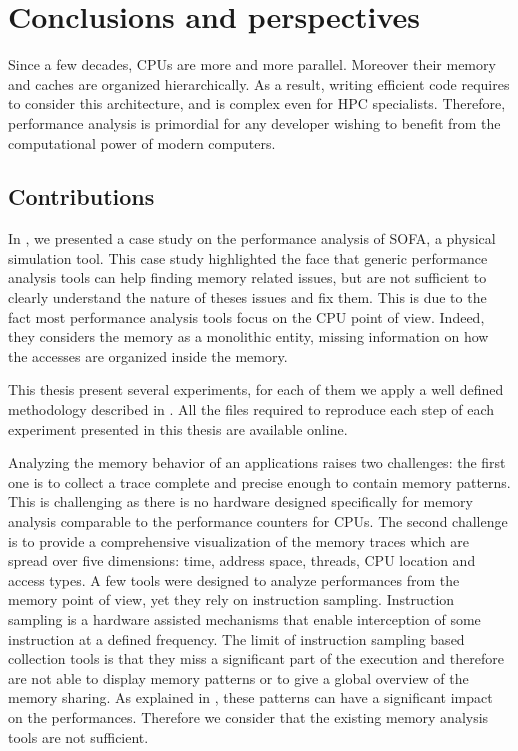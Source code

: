 \chapter{Conclusions and perspectives}
\label{chap:cncl}

Since a few decades, \glspl{CPU} are more and more parallel.
Moreover their memory and caches are organized hierarchically.
As a result, writing efficient code requires to consider this architecture, and is complex even for \gls{HPC} specialists.
Therefore, performance analysis is primordial for any developer wishing to benefit from the computational power of modern computers.

\section{Contributions}

In , we presented a case study on the performance analysis of \gls{SOFA}, a physical simulation tool.
This case study highlighted the face that generic performance analysis tools can help finding memory related issues, but are not sufficient to clearly understand the nature of theses issues and fix them.
This is due to the fact most performance analysis tools focus on the \gls{CPU} point of view.
Indeed, they considers the memory as a monolithic entity, missing information on how the accesses are organized inside the memory.

This thesis present several experiments, for each of them we apply a well defined methodology described in .
All the files required to reproduce each step of each experiment presented in this thesis are available online.

Analyzing the memory behavior of an applications raises two challenges: the first one is to collect a trace complete and precise enough to contain memory patterns.
This is challenging as there is no hardware designed specifically for memory analysis comparable to the performance counters for \glspl{CPU}.
The second challenge is to provide a comprehensive visualization of the memory traces which are spread over five dimensions: time, address space, threads, \gls{CPU} location and access types.
A few tools were designed to analyze performances from the memory point of view, yet they rely on instruction sampling.
Instruction sampling is a hardware assisted mechanisms that enable interception of some instruction at a defined frequency.
The limit of instruction sampling based collection tools is that they miss a significant part of the execution and therefore are not able to display memory patterns or to give a global overview of the memory sharing.
As explained in , these patterns can have a significant impact on the performances.
Therefore we consider that the existing memory analysis tools are not sufficient.

